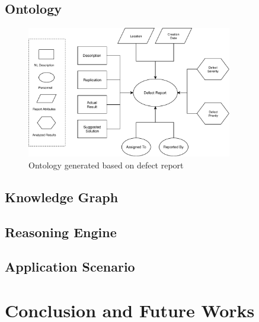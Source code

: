 \documentclass[12pt] {article}
\begin{document}
\subsection{Ontology}
\begin{figure}[h]
    \centering
    \includegraphics[width=0.8\textwidth]{../figures/OntologyOfDefectReport.pdf}
    \caption{Ontology generated based on defect report}
    \label{fig:defectreport}
\end{figure}
\subsection{Knowledge Graph}
\subsection{Reasoning Engine}
\subsection{Application Scenario}

\section{Conclusion and Future Works}


\pagebreak
\end{document}
